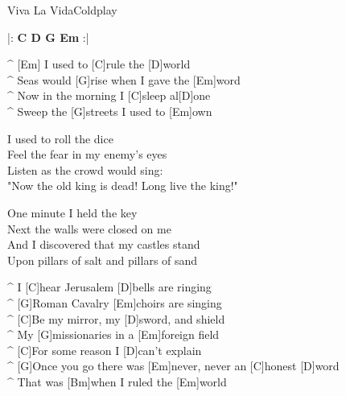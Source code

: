 \begin{song}{Viva La Vida}{Coldplay}

\begin{guitar}
|: \textbf{C D G Em} :|\\
\end{guitar}


\begin{guitar}
^ [Em]  I used to [C]rule the [D]world \\
^ Seas would [G]rise when I gave the [Em]word \\
^ Now in the morning I [C]sleep al[D]one \\
^ Sweep the [G]streets I used to [Em]own\\
\end{guitar}


\begin{guitar}
I used to roll the dice \\
Feel the fear in my enemy's eyes \\
Listen as the crowd would sing: \\
"Now the old king is dead! Long live the king!"\\
\end{guitar}

\begin{guitar}
One minute I held the key \\
Next the walls were closed on me \\
And I discovered that my castles stand \\
Upon pillars of salt and pillars of sand \\
\end{guitar}


\begin{guitar}
^ I [C]hear Jerusalem [D]bells are ringing \\
^ [G]Roman Cavalry [Em]choirs are singing \\
^ [C]Be my mirror, my [D]sword, and shield \\
^ My [G]missionaries in a [Em]foreign field \\
^ [C]For some reason I [D]can't explain \\
^ [G]Once you go there was [Em]never, never an [C]honest [D]word\\
^ That was [Bm]when I ruled the [Em]world \\
\end{guitar}



\end{song}
